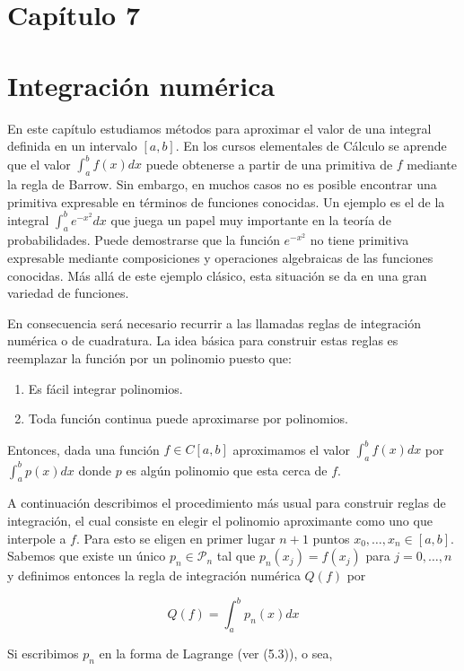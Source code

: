 \documentclass[10pt]{article}
\begin{document}
\section*{Capítulo 7}
\section*{Integración numérica}
En este capítulo estudiamos métodos para aproximar el valor de una integral definida en un intervalo $[a, b]$. En los cursos elementales de Cálculo se aprende que el valor $\int_{a}^{b} f(x) d x$ puede obtenerse a partir de una primitiva de $f$ mediante la regla de Barrow. Sin embargo, en muchos casos no es posible encontrar una primitiva expresable en términos de funciones conocidas. Un ejemplo es el de la integral $\int_{a}^{b} e^{-x^{2}} d x$ que juega un papel muy importante en la teoría de probabilidades. Puede demostrarse que la función $e^{-x^{2}}$ no tiene primitiva expresable mediante composiciones y operaciones algebraicas de las funciones conocidas. Más allá de este ejemplo clásico, esta situación se da en una gran variedad de funciones.

En consecuencia será necesario recurrir a las llamadas reglas de integración numérica o de cuadratura. La idea básica para construir estas reglas es reemplazar la función por un polinomio puesto que:

\begin{enumerate}
  \item Es fácil integrar polinomios.
  \item Toda función continua puede aproximarse por polinomios.
\end{enumerate}

Entonces, dada una función $f \in C[a, b]$ aproximamos el valor $\int_{a}^{b} f(x) d x$ por $\int_{a}^{b} p(x) d x$ donde $p$ es algún polinomio que esta cerca de $f$.

A continuación describimos el procedimiento más usual para construir reglas de integración, el cual consiste en elegir el polinomio aproximante como uno que interpole a $f$. Para esto se eligen en primer lugar $n+1$ puntos $x_{0}, \ldots, x_{n} \in[a, b]$. Sabemos que existe un único $p_{n} \in \mathcal{P}_{n}$ tal que $p_{n}\left(x_{j}\right)=f\left(x_{j}\right)$ para $j=0, \ldots, n$ y definimos entonces la regla de integración numérica $Q(f)$ por

$$
Q(f)=\int_{a}^{b} p_{n}(x) d x
$$

Si escribimos $p_{n}$ en la forma de Lagrange (ver (5.3)), o sea,
\end{document}
